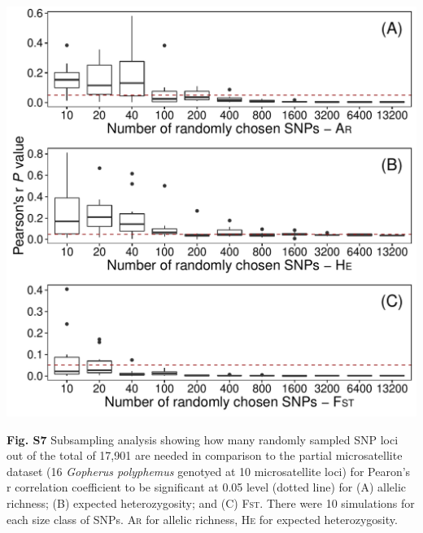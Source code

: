 \documentclass[english]{article}\usepackage[]{graphicx}\usepackage[]{color}
\makeatletter
\def\maxwidth{ %
  \ifdim\Gin@nat@width>\linewidth
    \linewidth
  \else
    \Gin@nat@width
  \fi
}
\newenvironment{knitrout}{}{} %
\makeatother
\begin{document}
\pagebreak{}
\noindent
\begin{knitrout}
\color{fgcolor}
\includegraphics[width=\maxwidth]{figure/Figure-S7-1} 

\end{knitrout}
\noindent
\textbf{Fig. S7} Subsampling analysis showing how many randomly sampled SNP loci out of the total of 17,901 are needed in comparison to the partial microsatellite dataset (16 \textit{Gopherus polyphemus} genotyed at 10 microsatellite loci) for Pearon's r correlation coefficient to be significant at 0.05 level (dotted line) for (A) allelic richness; (B) expected heterozygosity; and (C) \textsc{Fst}. There were 10 simulations for each size class of SNPs. \textsc{Ar} for allelic richness, \textsc{He} for expected heterozygosity.\\ 
\end{document}
